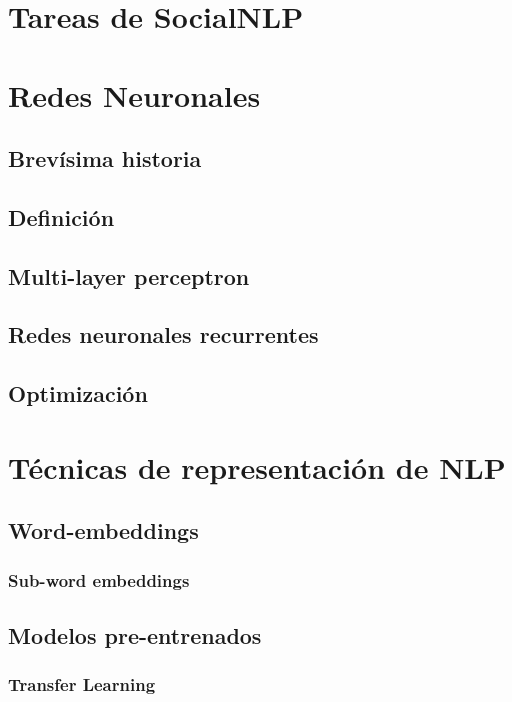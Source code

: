 \section{Tareas de SocialNLP}


\section{Redes Neuronales}

\subsection{Brevísima historia}
\subsection{Definición}
\subsection{Multi-layer perceptron}
\subsection{Redes neuronales recurrentes}
\subsection{Optimización}


\section{Técnicas de representación de NLP}
\subsection{Word-embeddings}



\subsubsection{Sub-word embeddings}

\subsection{Modelos pre-entrenados}

\subsubsection{Transfer Learning}

